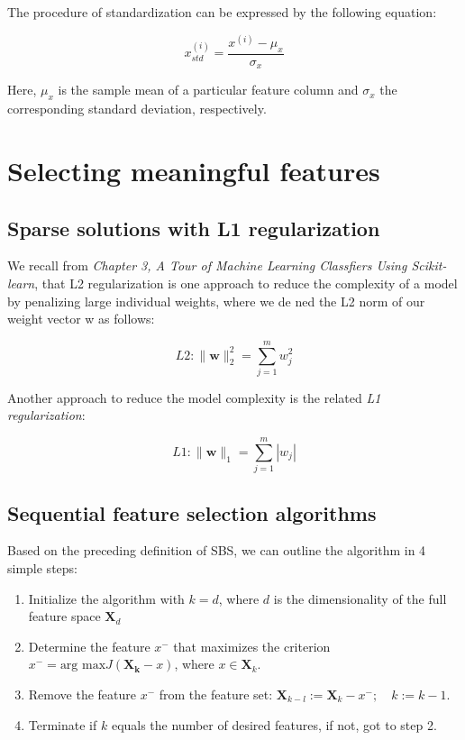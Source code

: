 \documentclass[letterpaper]{report}
\begin{document}
The procedure of standardization can be expressed by the following equation:

\[
x_{std}^{(i)} = \frac{x^{(i)} - \mu_{x}}{\sigma_{x}}
\]

Here, $\mu_{x}$ is the sample mean of a particular feature column and $\sigma_{x}$ the corresponding standard deviation, respectively.

\section{Selecting meaningful features}
\subsection{Sparse solutions with L1 regularization}

We recall from \textit{Chapter 3, A Tour of Machine Learning Classfiers Using Scikit-learn}, that L2 regularization is one approach to reduce the complexity of a model by penalizing large individual weights, where we de ned the L2 norm of our weight vector w as follows:

\[
L2: \lVert \mathbf{w} \rVert^{2}_{2} = \sum_{j=1}^{m} w^{2}_{j}
\]

Another approach to reduce the model complexity is the related \textit{L1 regularization}:

\[
L1: \lVert \mathbf{w} \rVert_{1} = \sum_{j=1}^{m} |w_j|
\]


\subsection{Sequential feature selection algorithms}

Based on the preceding definition of SBS, we can outline the algorithm in 4 simple steps:

\begin{enumerate}
\item Initialize the algorithm with $k=d$, where $d$  is the dimensionality of the full feature space $\mathbf{X}_d$
\item Determine the feature $x^{-}$ that maximizes the criterion $x^{-} = \text{arg max} J(\mathbf{X_k} - x)$, where  $x \in \mathbf{X}_k$.
\item Remove the feature $x^-$ from the feature set: $\mathbf{X}_{k-l} := \mathbf{X}_k - x^{-}; \quad k:= k-1$.
\item Terminate if $k$ equals the number of desired features, if not, got to step 2.

\end{enumerate}
\end{document}
